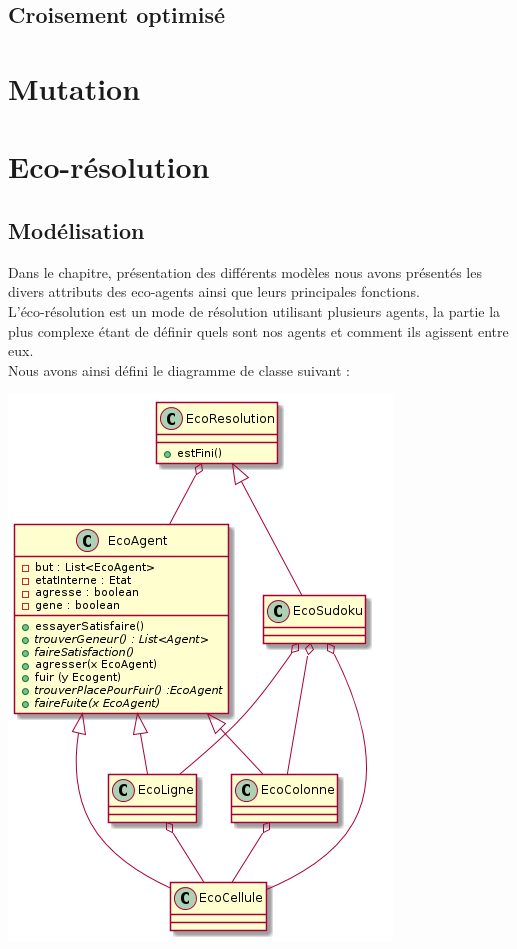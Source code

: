                 \subsection{Croisement optimisé}
        \section{Mutation}


    \section{Eco-résolution}
    \subsection{Modélisation}
    Dans le chapitre, présentation des différents modèles nous avons présentés les divers attributs des eco-agents ainsi que leurs principales fonctions. \\
    L'éco-résolution est un mode de résolution utilisant plusieurs agents, la partie la plus complexe étant de définir quels sont nos agents et comment ils agissent entre eux. \\
    Nous avons ainsi défini le diagramme de classe suivant : \\
    \begin{center}
    \includegraphics[scale=0.7]{diagrams/ecoResolution.png}
    \end{center} 

